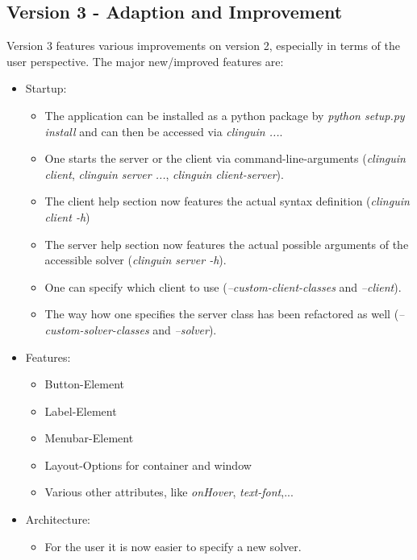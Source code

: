 \documentclass[12pt,a4paper]{article}
\newcommand{\<}[1]{\guilsinglleft}
\renewcommand{\>}[1]{\guilsinglright}
\begin{document}
\newpage
\subsection{Version 3 - Adaption and Improvement}

\noindent Version 3 features various improvements on version 2, especially in terms of the user perspective. The major new/improved features are:

\begin{itemize}
    \item Startup:
    \begin{itemize}
        \item The application can be installed as a python package by \textit{python setup.py install} and can then be accessed via \textit{clinguin ...}.
        \item One starts the server or the client via command-line-arguments (\textit{clinguin client}, \textit{clinguin server ...}, \textit{clinguin client-server}).
        \item The client help section now features the actual syntax definition (\textit{clinguin client -h})
        \item The server help section now features the actual possible arguments of the accessible solver (\textit{clinguin server -h}).
        \item One can specify which client to use (\textit{--custom-client-classes} and \textit{--client}).
        \item The way how one specifies the server class has been refactored as well (\textit{--custom-solver-classes} and \textit{--solver}).
    \end{itemize}
    \item Features:
    \begin{itemize}
        \item Button-Element
        \item Label-Element
        \item Menubar-Element
        \item Layout-Options for container and window
        \item Various other attributes, like \textit{onHover}, \textit{text-font},...
    \end{itemize}
    \item Architecture:
    \begin{itemize}
        \item For the user it is now easier to specify a new solver.

\end{itemize}
\end{itemize}
\end{document}

